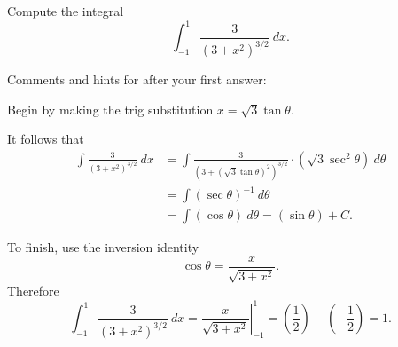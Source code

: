 \documentclass{ximera}
\begin{document}
\begin{question}%

Compute the integral 
\[\int_{-1}^{1}\frac{3}{(3+x^2)^{3/2}}~dx.\]
\begin{multiplechoice}
\end{multiplechoice}
Comments and hints for after your first answer:
\begin{feedback}
Begin by making the trig substitution \(x=\sqrt{3}\tan \theta\). \begin{hint} It follows that 
\[ \begin{aligned} \int\frac{3}{(3+x^2)^{3/2}}~dx & = \int \frac{3}{(3+(\sqrt{3}\tan \theta)^2)^{3/2}} \cdot (\sqrt{3}\sec^2 \theta)~d \theta \\
 & = \int (\sec \theta)^{-1}~d \theta \\ & = \int (\cos \theta) ~ d \theta = (\sin \theta) + C. \end{aligned} \] \begin{hint}
To finish, use the inversion identity \[\cos \theta = \frac{x}{\sqrt{3+x^2}}.\]
Therefore \[\int_{-1}^{1}\frac{3}{(3+x^2)^{3/2}}~dx = \left.\frac{x}{\sqrt{3+x^2}}\right|_{-1}^{1} = \left(\frac{1}{2}\right) - \left(-\frac{1}{2}\right) = 1.\] \end{hint} \end{hint}
\end{feedback}

\end{question}
\end{document}
